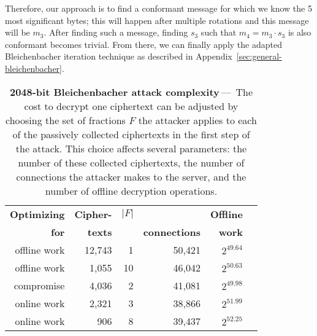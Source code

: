 Therefore, our approach is to find a conformant message for which we know the 5 most significant bytes; this will happen after multiple rotations and
this message will be $m_3$.
After finding such a message, finding $s_3$ such that $m_4 = m_3 \cdot s_3$ is also conformant becomes trivial.
From there, we can finally apply the adapted Bleichenbacher iteration technique as described in Appendix~\ref{sec:general-bleichenbacher}.

\begin{table}[t]
  \centering
	\begin{tabular}{rrrrrr}
	\toprule
	\textbf{Optimizing} & \textbf{Cipher-} & \textbf{$|F|$}     & \textbf{\ssltwo}  & \textbf{Offline} \\
        \textbf{for}        & \textbf{texts}   &           & \textbf{connections} & \textbf{work} \\
	\midrule
	offline work        &           12,743 &          1 &            50,421  & $2^{49.64}$ \\
        offline work        &            1,055 &         10 &              46,042  & $2^{50.63}$ \\
       	compromise          &            4,036 &          2 &              41,081  & $2^{49.98}$ \\
	online work         &            2,321 &          3 &              38,866  & $2^{51.99}$ \\
	online work         &              906 &          8 &              39,437  & $2^{52.25}$ \\
	\bottomrule
	\end{tabular}
		\caption{\textbf{2048-bit Bleichenbacher attack complexity}\,---\,%
		The cost to decrypt one ciphertext can be adjusted by choosing the set of
        fractions $F$ the attacker applies to each of the passively collected
		ciphertexts in the first step of the attack. This choice affects several
		parameters: the number of these collected ciphertexts, the number of
 		connections the attacker makes to the \ssltwo server, and the number of
		offline decryption operations.
		}
        \label{tab:reasonable_parameters}
\end{table}

